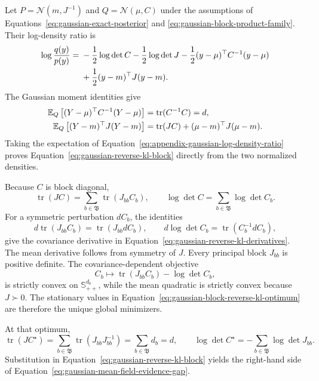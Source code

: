 Let \(P=\mathcal N(m,J^{-1})\) and \(Q=\mathcal N(\mu,C)\) under the assumptions of Equations~\eqref{eq:gaussian-exact-posterior} and \eqref{eq:gaussian-block-product-family}. Their log-density ratio is
\begin{align}
\log\frac{q(y)}{p(y)}
={}&-\frac12\log\det C-\frac12\log\det J
-\frac12(y-\mu)^\top C^{-1}(y-\mu)
\notag\\
&+\frac12(y-m)^\top J(y-m).
\label{eq:appendix-gaussian-log-density-ratio}
\end{align}
The Gaussian moment identities give
\begin{align}
\mathbb E_Q\left[(Y-\mu)^\top C^{-1}(Y-\mu)\right]
&=\operatorname{tr}(C^{-1}C)=d,
\label{eq:appendix-gaussian-centered-quadratic}\\
\mathbb E_Q\left[(Y-m)^\top J(Y-m)\right]
&=\operatorname{tr}(JC)+(\mu-m)^\top J(\mu-m).
\label{eq:appendix-gaussian-target-quadratic}
\end{align}
Taking the expectation of Equation~\eqref{eq:appendix-gaussian-log-density-ratio} proves Equation~\eqref{eq:gaussian-reverse-kl-block} directly from the two normalized densities.

Because \(C\) is block diagonal,
\begin{equation}
\operatorname{tr}(JC)=\sum_{b\in\mathfrak B}\operatorname{tr}(J_{bb}C_b),
\qquad
\log\det C=\sum_{b\in\mathfrak B}\log\det C_b.
\label{eq:appendix-block-trace-logdet}
\end{equation}
For a symmetric perturbation \(dC_b\), the identities
\begin{equation}
d\operatorname{tr}(J_{bb}C_b)=\operatorname{tr}(J_{bb}dC_b),
\qquad
d\log\det C_b=\operatorname{tr}(C_b^{-1}dC_b),
\label{eq:appendix-block-matrix-differentials}
\end{equation}
give the covariance derivative in Equation~\eqref{eq:gaussian-reverse-kl-derivatives}. The mean derivative follows from symmetry of \(J\). Every principal block \(J_{bb}\) is positive definite. The covariance-dependent objective
\begin{equation}
C_b\longmapsto
\operatorname{tr}(J_{bb}C_b)-\log\det C_b,
\label{eq:appendix-covariance-block-objective}
\end{equation}
is strictly convex on \(\mathbb S_{++}^{d_b}\), while the mean quadratic is strictly convex because \(J\succ0\). The stationary values in Equation~\eqref{eq:gaussian-block-reverse-kl-optimum} are therefore the unique global minimizers.

At that optimum,
\begin{equation}
\operatorname{tr}(JC^\star)
=\sum_{b\in\mathfrak B}\operatorname{tr}(J_{bb}J_{bb}^{-1})
=\sum_{b\in\mathfrak B}d_b=d,
\qquad
\log\det C^\star=-\sum_{b\in\mathfrak B}\log\det J_{bb}.
\label{eq:appendix-gaussian-optimum-substitution}
\end{equation}
Substitution in Equation~\eqref{eq:gaussian-reverse-kl-block} yields the right-hand side of Equation~\eqref{eq:gaussian-mean-field-evidence-gap}.

